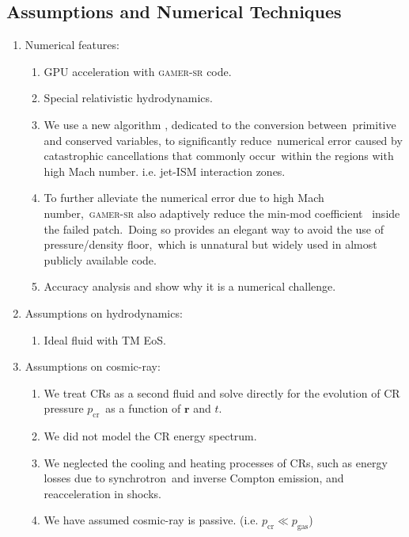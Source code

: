 \documentclass[twocolumn]{aastex631}
\begin{document}
\subsection{Assumptions and Numerical Techniques}
\begin{enumerate}
  \item Numerical features:
    \begin{enumerate}
      \item GPU acceleration with \textsc{gamer-sr} code.
      \item Special relativistic hydrodynamics.
      \item We use a new algorithm \citep{tseng2021}, dedicated to the conversion between\
            primitive and conserved variables, to significantly reduce\
            numerical error caused by catastrophic cancellations that commonly occur\
            within the regions with high Mach number. i.e. jet-ISM interaction zones.
      \item To further alleviate the numerical error due to high Mach number,\
            \textsc{gamer-sr} also adaptively reduce the min-mod coefficient \citep{tseng2021}\
            inside the failed patch.\
            Doing so provides an elegant way to avoid the use of pressure/density floor,\
            which is unnatural but widely used in almost publicly available code.
      \item Accuracy analysis and show why it is a numerical challenge.
    \end{enumerate}
  \item Assumptions on hydrodynamics:
    \begin{enumerate}
      \item Ideal fluid with TM EoS.
    \end{enumerate}
  \item Assumptions on cosmic-ray:
    \begin{enumerate}
      \item We treat CRs as a second fluid and solve directly for the evolution of CR pressure $p_{\text{cr}}$\
            as a function of $\mathbf{r}$ and $t$.
      \item We did not model the CR energy spectrum.
      \item We neglected the cooling and heating processes of CRs, such as energy losses due to synchrotron\
            and inverse Compton emission, and reacceleration in shocks.
      \item We have assumed cosmic-ray is passive. (i.e. $p_{\text{cr}}\ll p_{\text{gas}}$)

\end{enumerate}
\end{enumerate}
\end{document}
